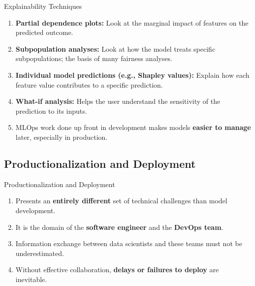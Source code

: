\begin{frame}{Explainability Techniques}
\begin{enumerate}
\item<1-> \textbf{Partial dependence plots:} Look at the marginal impact of features on the predicted outcome.
\item<2-> \textbf{Subpopulation analyses:} Look at how the model treats specific subpopulations; the basis of many fairness analyses.
\item<3-> \textbf{Individual model predictions (e.g., Shapley values):} Explain how each feature value contributes to a specific prediction.
\item<4-> \textbf{What-if analysis:} Helps the user understand the sensitivity of the prediction to its inputs.
\item<5-> MLOps work done up front in development makes models \textbf{easier to manage} later, especially in production.
\end{enumerate}
\end{frame}

\subsection{Productionalization and Deployment}

\begin{frame}{Productionalization and Deployment}
\begin{enumerate}
\item<1-> Presents an \textbf{entirely different} set of technical challenges than model development.
\item<2-> It is the domain of the \textbf{software engineer} and the \textbf{DevOps team}.
\item<3-> Information exchange between data scientists and these teams must not be underestimated.
\item<4-> Without effective collaboration, \textbf{delays or failures to deploy} are inevitable.
\end{enumerate}
\end{frame}

